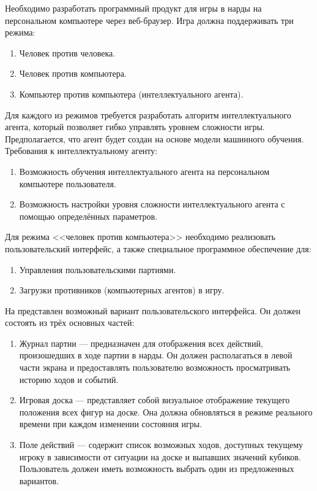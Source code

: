 Необходимо разработать программный продукт для игры в нарды на персональном компьютере через веб-браузер. Игра должна поддерживать три режима:

\begin{enumerate}
    \item Человек против человека.
    \item Человек против компьютера.
    \item Компьютер против компьютера (интеллектуального агента).
\end{enumerate}

Для каждого из режимов требуется разработать алгоритм интеллектуального агента, который позволяет гибко управлять уровнем сложности игры. Предполагается, что агент будет создан на основе модели машинного обучения. Требования к интеллектуальному агенту:

\begin{enumerate}
    \item Возможность обучения интеллектуального агента на персональном компьютере пользователя.
    \item Возможность настройки уровня сложности интеллектуального агента с помощью определённых параметров.
\end{enumerate}

Для режима <<человек против компьютера>> необходимо реализовать пользовательский интерфейс, а также специальное программное обеспечение для:

\begin{enumerate}
    \item Управления пользовательскими партиями.
    \item Загрузки противников (компьютерных агентов) в игру.
\end{enumerate}

На  представлен возможный вариант пользовательского интерфейса. Он должен состоять из трёх основных частей:

\begin{enumerate}
    \item Журнал партии --- предназначен для отображения всех действий, произошедших в ходе партии в нарды. Он должен располагаться в левой части экрана и предоставлять пользователю возможность просматривать историю ходов и событий.
    \item Игровая доска --- представляет собой визуальное отображение текущего положения всех фигур на доске. Она должна обновляться в режиме реального времени при каждом изменении состояния игры.
    \item Поле действий --- содержит список возможных ходов, доступных текущему игроку в зависимости от ситуации на доске и выпавших значений кубиков. Пользователь должен иметь возможность выбрать один из предложенных вариантов.
\end{enumerate}

